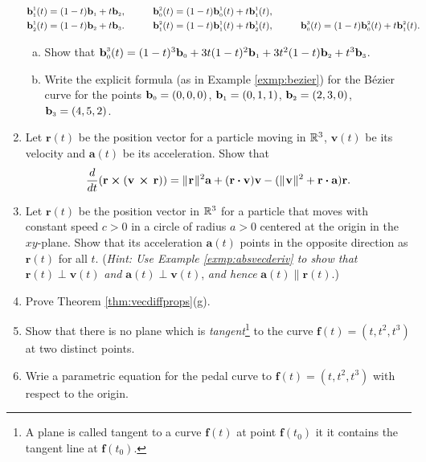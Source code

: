 \begin{enumerate}[\bfseries 1.]
\begin{alignat*}{3}
    \\
   \textbf{b}_{\scriptscriptstyle 1}^{\scriptscriptstyle 1}(t) &= ( 1 - t )\textbf{b}_{\scriptscriptstyle 1} + t \textbf{b}_{\scriptscriptstyle 2}, \qquad
    & \textbf{b}_{\scriptscriptstyle 0}^{\scriptscriptstyle 2}(t) &=
    ( 1 - t )\textbf{b}_{\scriptscriptstyle 0}^{\scriptscriptstyle 1}(t) + t \textbf{b}_{\scriptscriptstyle 1}^{\scriptscriptstyle 1}(t),
    \\
   \textbf{b}_{\scriptscriptstyle 2}^{\scriptscriptstyle 1}(t) &= ( 1 - t )\textbf{b}_{\scriptscriptstyle 2} + t \textbf{b}_{\scriptscriptstyle 3}.\qquad
    & \textbf{b}_{\scriptscriptstyle 1}^{\scriptscriptstyle 2}(t) &=
    ( 1 - t )\textbf{b}_{\scriptscriptstyle 1}^{\scriptscriptstyle 1}(t) + t \textbf{b}_{\scriptscriptstyle 2}^{\scriptscriptstyle 1}(t),\qquad
    & \textbf{b}_{\scriptscriptstyle 0}^{\scriptscriptstyle 3}(t) &=
    ( 1 - t )\textbf{b}_{\scriptscriptstyle 0}^{\scriptscriptstyle 2}(t) + t \textbf{b}_{\scriptscriptstyle 1}^{\scriptscriptstyle 2}(t).
  \end{alignat*}
  \begin{enumerate}[(a)]
   \item Show that $\textbf{b}_{\scriptscriptstyle 0}^{\scriptscriptstyle 3}(t) = (1 - t)^3 \textbf{b}_{\scriptscriptstyle 0} +
    3t(1 - t)^2 \textbf{b}_{\scriptscriptstyle 1} + 3t^2 (1 - t) \textbf{b}_{\scriptscriptstyle 2} + t^3 \textbf{b}_{\scriptscriptstyle 3}$.
   \item Write the explicit formula (as in Example \ref{exmp:bezier}) for the B\'{e}zier curve for the points
   $\textbf{b}_{\scriptscriptstyle 0} = (0,0,0)$, $\textbf{b}_{\scriptscriptstyle 1} = (0,1,1)$, $\textbf{b}_{\scriptscriptstyle 2} = (2,3,0)$,
   $\textbf{b}_{\scriptscriptstyle 3} = (4,5,2)$.
  \end{enumerate}
\item 
Let $\textbf{r}(t)$ be the position vector for a particle moving in $\mathbb{R}^{3}$,
$\textbf{v}(t)$ be its velocity 
and $\textbf{a}(t)$ be its acceleration.
Show that
  \begin{displaymath}
   \dfrac{d}{dt} ( \textbf{r} \bm{\times} ( \textbf{v}\, \bm{\times} \,\textbf{r} ) ) =
    \lVert\mspace{1mu}\textbf{r}\mspace{1mu}\rVert^2 \textbf{a} + (\textbf{r} \bm{\cdot} \textbf{v}) \textbf{v} -
    (\lVert\mspace{1mu}\textbf{v}\mspace{1mu}\rVert^2 + \textbf{r} \bm{\cdot} \textbf{a})\textbf{r}.
  \end{displaymath} 
\item 
Let $\textbf{r}(t)$ be the position vector in $\mathbb{R}^{3}$ for a particle that moves with constant speed $c > 0$ in a circle of radius $a > 0$ centered at the origin in the $xy$-plane. 
Show that its acceleration $\textbf{a}(t)$ points in the opposite direction as
  $\textbf{r}(t)$ for all $t$. (\emph{Hint: Use Example \ref{exmp:absvecderiv} to show that} $\textbf{r}(t)
  \perp \textbf{v}(t)$ \emph{and} $\textbf{a}(t) \perp \textbf{v}(t)$, \emph{and hence} $\textbf{a}(t) \parallel
  \textbf{r}(t)$.)
 \item Prove Theorem \ref{thm:vecdiffprops}(g).
 
 \item Show that there is no plane which is \emph{tangent}\footnote{A plane is called tangent to a curve $\textbf{f}(t)$ at point $\textbf{f}(t_0)$ it it contains the tangent line at $\textbf{f}(t_0)$.} to the curve $\textbf{f}(t)=(t,t^2,t^3)$ at two distinct points.
 \item Wrie a parametric equation for the pedal curve to $\textbf{f}(t)=(t,t^2,t^3)$ with respect to the origin.
\end{enumerate}

